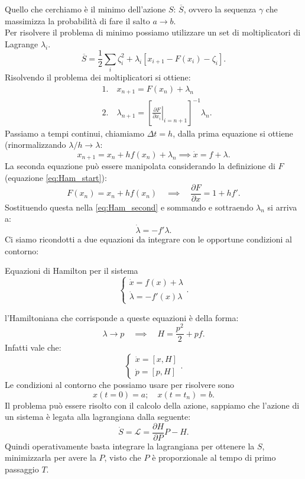Quello che cerchiamo è il minimo dell'azione $S$: $\overline{S}$, ovvero la sequenza $\gamma$ che massimizza la probabilità di fare il salto $a\to b$.\\
Per risolvere il problema di minimo possiamo utilizzare un set di moltiplicatori di Lagrange $\lambda_i$.
\[
    \overline{S} = \frac{1}{2}\sum_{i}^{} \zeta^2_i + \lambda_i \left[x_{i+1}-F(x_i)- \zeta_i\right]
.\] 
Risolvendo il problema dei moltiplicatori si ottiene:
\begin{align}
    &1. \quad x_{n+1} = F(x_n) + \lambda_n\\
    &2. \quad \lambda_{n+1}=\left[\left.\frac{\partial F}{\partial x_i} \right|_{i = n+1}\right]^{-1}\lambda_n \label{eq:Ham_second}
.\end{align}
Passiamo a tempi continui, chiamiamo $\Delta t = h$, dalla prima equazione si ottiene (rinormalizzando $\lambda / h\to \lambda$:
\[
    x_{n+1} = x_n + h f(x_n) + \lambda_n \implies  \dot{x} = f + \lambda
.\] 
La seconda equazione può essere manipolata considerando la definizione di $F$ (equazione \ref{eq:Ham_start}):
\[
    F(x_n) = x_n+hf(x_n) \quad \implies  \quad  \frac{\partial F}{\partial x} = 1+hf'
.\] 
Sostituendo questa nella \ref{eq:Ham_second} e sommando e sottraendo $\lambda_n$ si arriva a:
\[
    \dot{\lambda} =  - f'\lambda
.\] 
Ci siamo ricondotti a due equazioni da integrare con le opportune condizioni al contorno:
\begin{redbox}{Equazioni di Hamilton per il sistema}
\[
    \begin{cases}
	\dot{x} = f(x) + \lambda\\
	\dot{\lambda } = - f'(x) \lambda
    \end{cases}
.\]     
\end{redbox}
\noindent
l'Hamiltoniana che corrisponde a queste equazioni è della forma:
\[
    \lambda  \to p \quad \implies  \quad H = \frac{p^2}{2} + pf
.\] 
Infatti vale che:
\[
    \begin{cases}
	\dot{x} = \left[x,H\right]\\
	\dot{p} = \left[p,H\right]
    \end{cases}
.\] 
Le condizioni al contorno che possiamo usare per risolvere sono 
\[
    x(t=0) = a; \quad x(t = t_n) = b
.\] 
Il problema può essere risolto con il calcolo della azione, sappiamo che l'azione di un sistema è legata alla lagrangiana dalla seguente:
\[
    \dot{S} = \mathcal{L} = \frac{\partial H}{\partial P} P - H
.\] 
Quindi operativamente basta integrare la lagrangiana per ottenere la $S$, minimizzarla per avere la $P$, visto che $P$ è proporzionale al tempo di primo passaggio $T$. 
